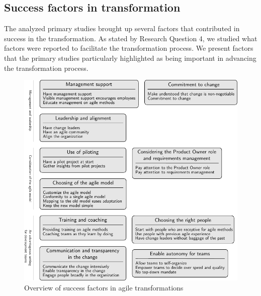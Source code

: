 


\clearpage

\subsection{Success factors in transformation}

The analyzed primary studies brought up several factors that contributed in
success in the transformation. As stated by Research Question 4, we studied what
factors were reported to facilitate the transformation process. We present
factors that the primary studies particularly highlighted as being important in
advancing the transformation process.

\begin{figure}[!b]
  \begin{center}
    \includegraphics[width=1\textwidth]{graphics/success_summary.pdf}
    \caption{Overview of success factors in agile transformations}
    \label{fig:success_summary}
  \end{center}
\end{figure}

